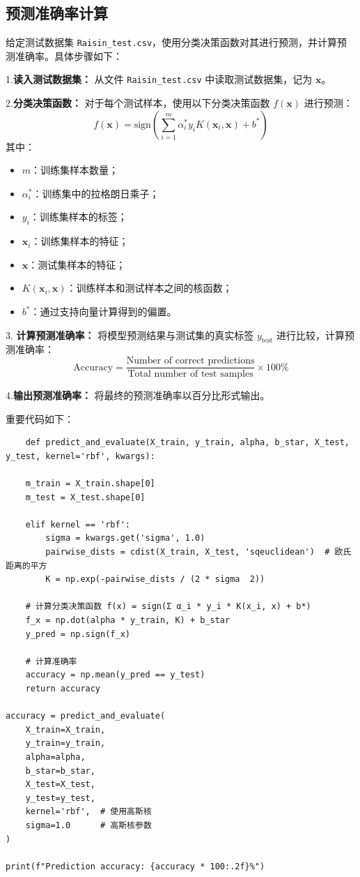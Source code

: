 \documentclass[12pt,a4paper,oneside]{article}
\begin{document}
\subsection{预测准确率计算}
\qquad 给定测试数据集 \texttt{Raisin\_test.csv}，使用分类决策函数对其进行预测，并计算预测准确率。具体步骤如下：

1.\textbf {读入测试数据集：}  
   从文件 \texttt{Raisin\_test.csv} 中读取测试数据集，记为 \(\pmb{x}\)。

2.\textbf {分类决策函数：}  
   对于每个测试样本，使用以下分类决策函数 \( f(\pmb{x}) \) 进行预测：
   \[
   f(\pmb{x}) = \text{sign} \left( \sum_{i=1}^m \alpha_i^* y_i K(\pmb{x}_i, \pmb{x}) + b^* \right)
   \]
   其中：
   \begin{itemize}
       \item \( m \)：训练集样本数量；
       \item \( \alpha_i^* \)：训练集中的拉格朗日乘子；
       \item \( y_i \)：训练集样本的标签；
       \item \( \pmb{x}_i \)：训练集样本的特征；
       \item \( \pmb{x} \)：测试集样本的特征；
       \item \( K(\pmb{x}_i, \pmb{x}) \)：训练样本和测试样本之间的核函数；
       \item \( b^* \)：通过支持向量计算得到的偏置。
   \end{itemize}

3. \textbf{计算预测准确率：  }
   将模型预测结果与测试集的真实标签 \( y_{\text{test}} \) 进行比较，计算预测准确率：
   \[
   \text{Accuracy} = \frac{\text{Number of correct predictions}}{\text{Total number of test samples}} \times 100\%
   \]

4.\textbf {输出预测准确率：  }
   将最终的预测准确率以百分比形式输出。

   重要代码如下：
\begin{lstlisting}
    def predict_and_evaluate(X_train, y_train, alpha, b_star, X_test, y_test, kernel='rbf', kwargs):

    m_train = X_train.shape[0]
    m_test = X_test.shape[0]

    elif kernel == 'rbf':
        sigma = kwargs.get('sigma', 1.0)
        pairwise_dists = cdist(X_train, X_test, 'sqeuclidean')  # 欧氏距离的平方
        K = np.exp(-pairwise_dists / (2 * sigma  2))

    # 计算分类决策函数 f(x) = sign(Σ α_i * y_i * K(x_i, x) + b*)
    f_x = np.dot(alpha * y_train, K) + b_star
    y_pred = np.sign(f_x)

    # 计算准确率
    accuracy = np.mean(y_pred == y_test)
    return accuracy

accuracy = predict_and_evaluate(
    X_train=X_train,
    y_train=y_train,
    alpha=alpha,
    b_star=b_star,
    X_test=X_test,
    y_test=y_test,
    kernel='rbf',  # 使用高斯核
    sigma=1.0      # 高斯核参数
)

print(f"Prediction accuracy: {accuracy * 100:.2f}%")
\end{lstlisting}
\end{document}
